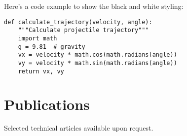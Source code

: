 \documentclass[
    language=english,
    doctype=cv,
    institution=none,
    titlestyle=cv
]{../../omnilatex}
\begin{document}
Here's a code example to show the black and white styling:

\begin{verbatim}
def calculate_trajectory(velocity, angle):
    """Calculate projectile trajectory"""
    import math
    g = 9.81  # gravity
    vx = velocity * math.cos(math.radians(angle))
    vy = velocity * math.sin(math.radians(angle))
    return vx, vy
\end{verbatim}

\section*{Publications}
Selected technical articles available upon request.
\end{document}
